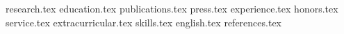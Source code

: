 \documentclass[9pt, a4paper]{awesome-cv}
\newcommand*{\sectiondir}{resume/}
\begin{document}
\newcommand*{\cvexptitle}[2]{
  \setlength\tabcolsep{0pt}
  \setlength{\extrarowheight}{0pt}
  \begin{tabular*}{\textwidth}{@{\extracolsep{\fill}} L{12.5cm} R{4.5cm}}
    \entrytitlestyle{#1} & \entrylocationstyle{#2} \\
  \end{tabular*}
}

\newcommand*{\cvexppos}[2]{
  \setlength\tabcolsep{0pt}
  \setlength{\extrarowheight}{0pt}
  \begin{tabular*}{\textwidth}{@{\extracolsep{\fill}} L{12.5cm} R{4.5cm}}
    \entrypositionstyle{#2} & \entrydatestyle{#1} \\
  \end{tabular*}
}

{research.tex}
{education.tex}
{publications.tex}
{press.tex}
{experience.tex}
{honors.tex}
{service.tex}
{extracurricular.tex}
{skills.tex}
{english.tex}
{references.tex}
\end{document}
